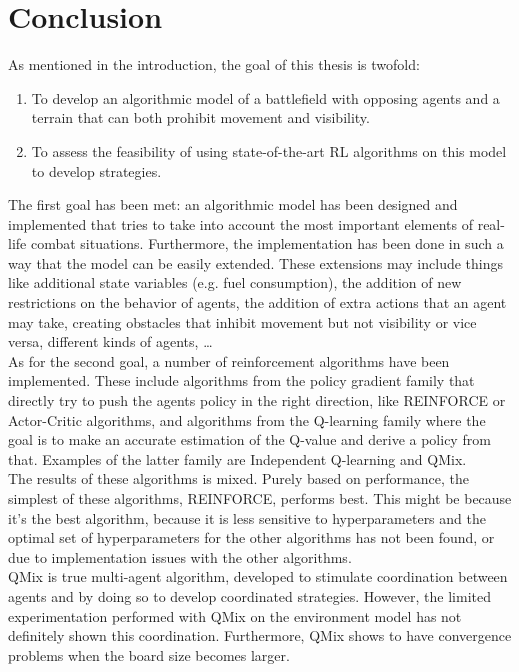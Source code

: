 \chapter{Conclusion}
\label{ch:conclusion}
As mentioned in the introduction, the goal of this thesis is twofold:
\begin{enumerate}
    \item To develop an algorithmic model of a battlefield with opposing agents and a terrain that can both prohibit movement and visibility.
    \item To assess the feasibility of using state-of-the-art RL algorithms on this model to develop strategies.
\end{enumerate}
The first goal has been met: an algorithmic model has been designed and implemented that tries to take into account the most important elements of real-life combat situations. Furthermore, the implementation has been done in such a way that the model can be easily extended. These extensions may include things like additional state variables (e.g. fuel consumption), the addition of new restrictions on the behavior of agents, the addition of extra actions that an agent may take, creating obstacles that inhibit movement but not visibility or vice versa, different kinds of agents, \ldots\\
As for the second goal, a number of reinforcement algorithms have been implemented. These include algorithms from the policy gradient family that directly try to push the agents policy in the right direction, like REINFORCE or Actor-Critic algorithms, and algorithms from the Q-learning family where the goal is to make an accurate estimation of the Q-value and derive a policy from that. Examples of the latter family are Independent Q-learning and QMix.\\
The results of these algorithms is mixed. Purely based on performance, the simplest of these algorithms, REINFORCE, performs best. This might be because it's the best algorithm, because it is less sensitive to hyperparameters and the optimal set of hyperparameters for the other algorithms has not been found, or due to implementation issues with the other algorithms.\\
QMix is true multi-agent algorithm, developed to stimulate coordination between agents and by doing so to develop coordinated strategies. However, the limited experimentation performed with QMix on the environment model has not definitely shown this coordination. Furthermore, QMix shows to have convergence problems when the board size becomes larger.\\
